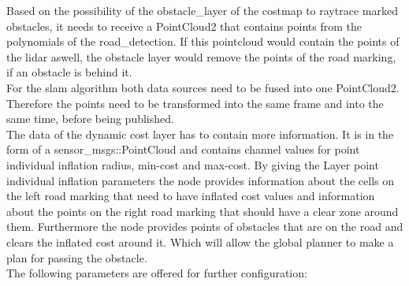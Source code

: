 Based on the possibility of the obstacle\_layer of the costmap to raytrace marked obstacles, it needs to receive a PointCloud2 that contains points from the polynomials of the road\_detection. If this pointcloud would contain the points of the lidar aswell, the obstacle layer would remove the points of the road marking, if an obstacle is behind it.\\

For the slam algorithm both data sources need to be fused into one PointCloud2. Therefore the points need to be transformed into the same frame and into the same time, before being published.\\

The data of the dynamic cost layer has to contain more information. It is in the form of a sensor\_msgs::PointCloud and contains channel values for point individual inflation radius, min-cost and max-cost. By giving the Layer point individual inflation parameters the node provides information about the cells on the left road marking that need to have inflated cost values and information about the points on the right road marking that should have a clear zone around them. Furthermore the node provides points of obstacles that are on the road and clears the inflated cost around it. Which will allow the global planner to make a plan for passing the obstacle.\\

The following parameters are offered for further configuration:

\begin{table}[H]
\centering
{}

\caption{MarkeFreeSpace parameters}
\label{markfreespaceparams}
\end{table}

